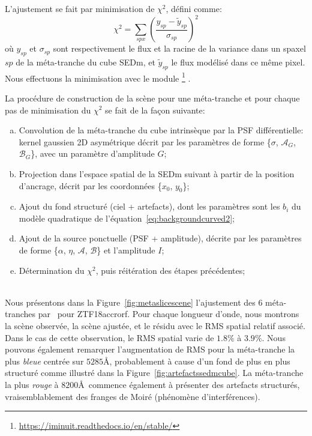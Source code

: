 \documentclass[../main/main.tex]{subfiles}
\begin{document}
L'ajustement se fait par minimisation de $\chi^{2}$, défini comme:
\begin{equation}
  \label{eq:chi2hypergal}
  \chi^{2}=\sum\limits_{spx}\left(\frac{y_{sp} - \widetilde{y}_{sp}}{\sigma_{sp}}\right)^{2}
\end{equation}
où $y_{sp}$ et $\sigma_{sp}$ sont respectivement le flux et la racine de
la variance dans un spaxel $sp$ de la méta-tranche du cube SEDm, et
$\widetilde{y}_{sp}$ le flux modélisé dans ce même pixel.
Nous effectuons la minimisation avec le module
\footnote{\url{https://iminuit.readthedocs.io/en/stable/}} \citep{James:1975dr,iminuit}.

La procédure de construction de la scène pour une méta-tranche et pour
chaque pas de minimisation du $\chi^{2}$ se fait de la façon
suivante:

\begin{minipage}{\textwidth}%
  \begin{enumerate}[(a)]
    \itemsep=0em
  \item Convolution de la méta-tranche du cube intrinsèque par la PSF
    différentielle: kernel
    gaussien 2D asymétrique décrit par les paramètres de forme \{$\sigma$,
$\mathcal{A}_{G}$, $\mathcal{B}_{G}$\}, avec un paramètre d'amplitude $G$;
  \item Projection dans l'espace spatial de la SEDm suivant à partir de
    la position d'ancrage, décrit par les coordonnées \{$x_{0}$, $y_{0}$\};
  \item Ajout du fond structuré (ciel + artefacts), dont les paramètres
    sont les $b_{i}$ du modèle quadratique de l'équation~\ref{eq:backgroundcurved2};
  \item Ajout de la source ponctuelle (PSF + amplitude), décrite par les
    paramètres de forme \{$\alpha$, $\eta$, $\mathcal{A}$,
    $\mathcal{B}$\} et l'amplitude $I$;
  \item Détermination du $\chi^{2}$, puis réitération des étapes précédentes;
  \end{enumerate}
\end{minipage}\\

Nous présentons dans la Figure~\ref{fig:metaslicescene} l'ajustement des
$6$ méta-tranches par \hypergal\ pour ZTF18accrorf. Pour chaque longueur
d'onde, nous montrons la scène observée, la scène ajustée, et le résidu
avec le RMS spatial relatif associé. Dans le cas de cette observation, le RMS
spatial varie de $1.8\%$ à $3.9\%$. Nous pouvons également remarquer
l'augmentation de RMS pour la méta-tranche la plus \textit{bleue}
centrée sur $5285$\AA, probablement à cause d'un fond de plus en plus
structuré comme illustré dans la Figure~\ref{fig:artefactssedmcube}. La
méta-tranche la plus \textit{rouge} à $8200$\AA\ commence également à
présenter des artefacts structurés, vraisemblablement des franges de
Moiré (phénomène d'interférences).
\end{document}
